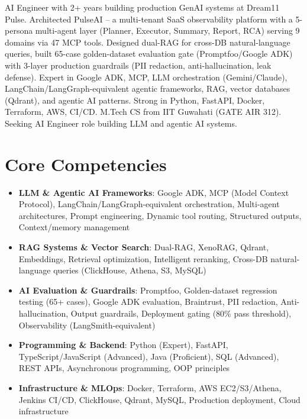 \documentclass[11pt,a4paper,sans]{moderncv}
\begin{document}
\makecvtitle


\vspace{6pt}
\small{AI Engineer with 2+ years building production GenAI systems at Dream11 Pulse. Architected PulseAI -- a multi-tenant SaaS observability platform with a 5-persona multi-agent layer (Planner, Executor, Summary, Report, RCA) serving 9 domains via 47 MCP tools. Designed dual-RAG for cross-DB natural-language queries, built 65-case golden-dataset evaluation gate (Promptfoo/Google ADK) with 3-layer production guardrails (PII redaction, anti-hallucination, leak defense). Expert in Google ADK, MCP, LLM orchestration (Gemini/Claude), LangChain/LangGraph-equivalent agentic frameworks, RAG, vector databases (Qdrant), and agentic AI patterns. Strong in Python, FastAPI, Docker, Terraform, AWS, CI/CD. M.Tech CS from IIT Guwahati (GATE AIR 312). Seeking AI Engineer role building LLM and agentic AI systems.}


\section{Core Competencies}
\vspace{1pt}
\begin{itemize}

\item \textbf{LLM \& Agentic AI Frameworks}: Google ADK, MCP (Model Context Protocol), LangChain/LangGraph-equivalent orchestration, Multi-agent architectures, Prompt engineering, Dynamic tool routing, Structured outputs, Context/memory management

\item \textbf{RAG Systems \& Vector Search}: Dual-RAG, XenoRAG, Qdrant, Embeddings, Retrieval optimization, Intelligent reranking, Cross-DB natural-language queries (ClickHouse, Athena, S3, MySQL)

\item \textbf{AI Evaluation \& Guardrails}: Promptfoo, Golden-dataset regression testing (65+ cases), Google ADK evaluation, Braintrust, PII redaction, Anti-hallucination, Output guardrails, Deployment gating (80\% pass threshold), Observability (LangSmith-equivalent)

\item \textbf{Programming \& Backend}: Python (Expert), FastAPI, TypeScript/JavaScript (Advanced), Java (Proficient), SQL (Advanced), REST APIs, Asynchronous programming, OOP principles

\item \textbf{Infrastructure \& MLOps}: Docker, Terraform, AWS EC2/S3/Athena, Jenkins CI/CD, ClickHouse, Qdrant, MySQL, Production deployment, Cloud infrastructure

\end{itemize}
\end{document}
